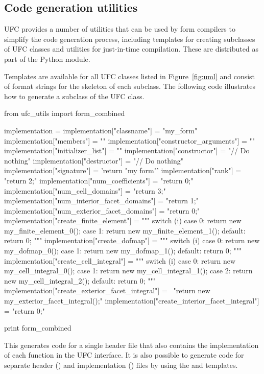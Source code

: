 \subsection{Code generation utilities}

UFC provides a number of utilities that can be used by form compilers
to simplify the code generation process, including templates for
creating subclasses of UFC classes and utilities for just-in-time
compilation.  These are distributed as part of the 
Python module.

Templates are available for all UFC classes listed in
Figure~\ref{fig:uml} and consist of format strings for the skeleton of
each subclass. The following code illustrates how to generate a
subclass of the UFC  class.

\begin{python}
from ufc_utils import form_combined

implementation = {}
implementation["classname"] = "my_form"
implementation["members"] = ""
implementation["constructor_arguments"] = ""
implementation["initializer_list"] = ""
implementation["constructor"] = "// Do nothing"
implementation["destructor"] = "// Do nothing"
implementation["signature"] = 'return "my form"'
implementation["rank"] = "return 2;"
implementation["num_coefficients"] = "return 0;"
implementation["num_cell_domains"] = "return 3;"
implementation["num_interior_facet_domains"] = "return 1;"
implementation["num_exterior_facet_domains"] = "return 0;"
implementation["create_finite_element"] = """
switch (i)
{
case 0:
  return new my_finite_element_0();
case 1:
  return new my_finite_element_1();
default:
  return 0;
}"""
implementation["create_dofmap"] = """
switch (i)
{
case 0:
  return new my_dofmap_0();
case 1:
  return new my_dofmap_1();
default:
  return 0;
}"""
implementation["create_cell_integral"] = """
switch (i)
{
case 0:
  return new my_cell_integral_0();
case 1:
  return new my_cell_integral_1();
case 2:
  return new my_cell_integral_2();
default:
  return 0;
}"""
implementation["create_exterior_facet_integral"] = \
    "return new my_exterior_facet_integral();"
implementation["create_interior_facet_integral"] = "return 0;"

print form_combined %
\end{python}

This generates code for a single header file that also contains the
implementation of each function in the UFC \emp{form} interface. It is
also possible to generate code for separate header (\emp{.h}) and
implementation (\emp{.cpp}) files by using the \emp{form\_header} and
\emp{form\_implementation} templates.

